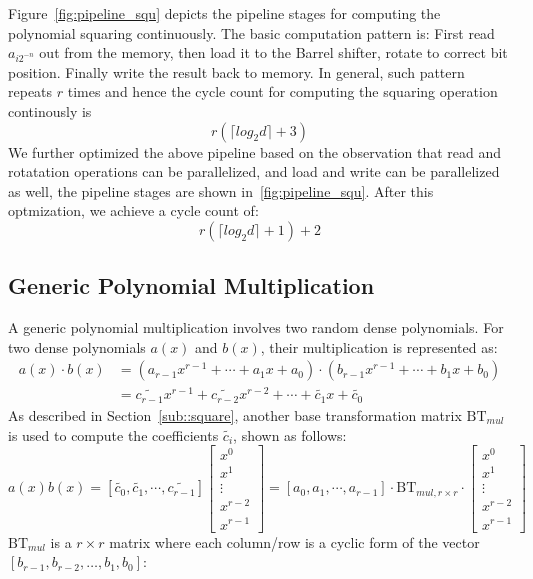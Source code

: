 \documentclass[runningheads]{llncs}
\begin{document}
Figure~\ref{fig:pipeline_squ} depicts the pipeline stages for computing the 
polynomial squaring continuously. 
The basic computation pattern is: 
First read $a_{i2^{-n}}$ out from the memory, 
then load it to the Barrel shifter, rotate to correct bit position.
Finally write the result back to memory. 
In general, such pattern repeats $r$ times and 
hence the cycle count for computing the squaring operation continously is
\[
    r(\lceil log_2d\rceil+3)
\]
We further optimized the above pipeline based on the observation 
that read and rotatation operations can be parallelized, 
and load and write can be parallelized as well,
the pipeline stages are shown in~\ref{fig:pipeline_squ}. 
After this optmization, we achieve a cycle count of:
\[
    r(\lceil log_2d\rceil+1)+2
\]

 
\subsection{Generic Polynomial Multiplication} 
\label{sub::dense}
A generic polynomial multiplication involves two random dense polynomials. 
For two dense polynomials $a(x)$ and $b(x)$, their multiplication is represented as:
\begin{align}
    a(x)\cdot b(x) &= (a_{r-1}x^{r-1}+\cdots + a_{1}x + a_0)\cdot(b_{r-1}x^{r-1}+\cdots + b_{1}x + b_0)\\
    &= \widetilde{c_{r-1}}x^{r-1}+\widetilde{c_{r-2}}x^{r-2}+\cdots + \widetilde{c_{1}}x +\widetilde{c_0}
\end{align}
%
As described in Section~\ref{sub::square}, 
another base transformation matrix $\text{BT}_{mul}$ is used to compute the coefficients $\widetilde{c_{i}}$, shown as follows:
\[
a(x)b(x)= [\widetilde{c_{0}},\widetilde{c_{1}},\cdots,\widetilde{c_{r-1}}]\left[ \begin{array}{c}
x^{0} \\
x^{1} \\
\vdots\\
x^{r-2}\\
x^{r-1}
\end{array}
\right ]
=
[{a_{0}},{a_{1}},\cdots,{a_{r-1}}]
\cdot \text{BT}_{mul,r\times r} \cdot
\left[ \begin{array}{c}
x^{0} \\
x^{1} \\
\vdots\\
x^{r-2}\\
x^{r-1}
\end{array}
\right ]
\]
$\text{BT}_{mul}$ is a $r\times r$ matrix where each column/row is a cyclic form of the vector $[b_{r-1},b_{r-2},\ldots, b_{1},b_{0}]$:
\end{document}
